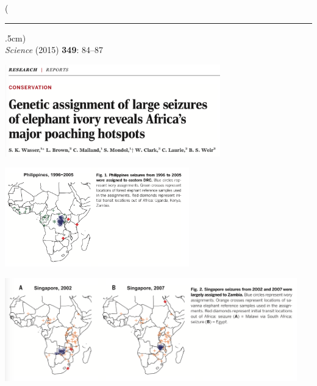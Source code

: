 \documentclass[10pt]{beamer}
\newenvironment{reference}[2]{%
	\begin{textblock*}{\textwidth}(#1,#2)
		\tiny\bgroup\color{gray}}{\egroup\end{textblock*}}
\begin{document}
\begin{frame}[t]
\vspace{0.5cm}
	
	\begin{reference}{4mm}{92mm}
		\rule{1.5cm}{0.25pt}\\
		\emph{Science} (2015) \textbf{349}: 84--87
	\end{reference}
	
	\includegraphics[width=0.7\textwidth]{figures/wasser3.png}\\
	
	\vspace{0.5cm}
	
	
	\begin{center}
		\includegraphics[width=0.6\textwidth]{figures/wasser_map5.png}
	\end{center}
	
\end{frame}


\begin{frame}

	\begin{center}
		\includegraphics[width=0.95\textwidth]{figures/wasser_map6.png}
	\end{center}
	
\end{frame}
\end{document}
